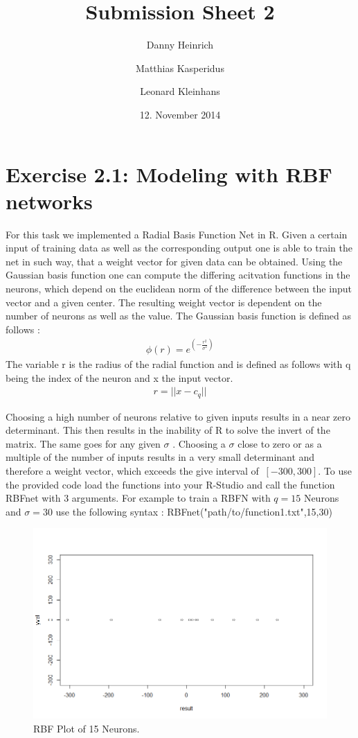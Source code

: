 \documentclass{scrartcl}
\title{Submission Sheet 2}
\author{Danny Heinrich \and Matthias Kasperidus \and Leonard Kleinhans}
\date{12. November 2014}
\begin{document}
\maketitle

\section{Exercise 2.1: Modeling with RBF networks}
For this task we implemented a Radial Basis Function Net in R. Given a certain input of training data as well as the corresponding output one is able to train the net in such way, that a weight vector 
for given data can be obtained. Using the Gaussian basis function one can compute the differing acitvation functions in the neurons, which depend on  the euclidean norm of the difference between the input vector and
a given center. The resulting weight vector is dependent on the number of neurons as well as the value. The Gaussian basis function is defined as follows :
\begin{align*}
\phi (r) = e^{(-\frac{r^2}{\sigma^2})} 
\end{align*}
The variable r is the radius of the radial function and is defined as follows with q being the index of the neuron and x the input vector.
\begin{align*}
r = ||x-c_q||
\end{align*}

Choosing a high number of neurons relative to given inputs results in a near zero determinant. This then results in the inability of R to solve the invert of the matrix. The same goes for any given $\sigma$ . Choosing a $\sigma$ close to zero or as a multiple of the number of inputs results in a very small determinant and therefore a weight vector, which exceeds the give interval of $\ [-300,300]$.
To use the provided code load the functions into your R-Studio and call the function RBFnet with 3 arguments. For example to train a RBFN with $ q = 15$ Neurons and $\sigma = 30$ use the following syntax : 
RBFnet("path/to/function1.txt",15,30)
\begin{figure}[ht]
\begin{center}
\includegraphics[scale=0.5]{RBF.png}
\end{center}
\caption{RBF Plot of 15 Neurons.}
\label{Img:RBFNetPlot}
\end{figure}
\end{document}
